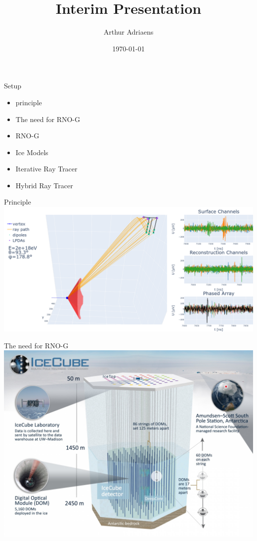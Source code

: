 \documentclass{beamer}
\title{Interim Presentation}
\author{Arthur Adriaens}
\date{\today}
\begin{document}
\begin{frame}
	\titlepage
\end{frame}
\begin{frame}{Setup}
  \begin{itemize}
    \item principle
    \item The need for RNO-G
    \item RNO-G
    \item Ice Models
    \item Iterative Ray Tracer
    \item Hybrid Ray Tracer
  \end{itemize}
\end{frame}
\begin{frame}{Principle}
  \includegraphics[width=\textwidth]{figures/mechanism.png}
\end{frame}
\begin{frame}{The need for RNO-G}
  \includegraphics[height=0.9\textheight]{figures/icecube.jpg}
\end{frame}
\end{document}
